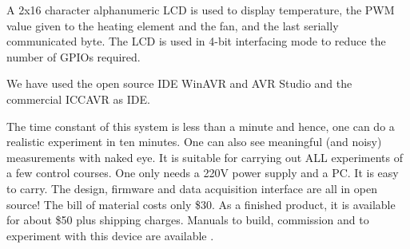 A 2x16 character alphanumeric LCD is used to display temperature, the
PWM value given to the heating element and the fan, and the last
serially communicated byte.  The LCD is used in 4-bit interfacing mode
to reduce the number of GPIOs required.

We have used the open source IDE WinAVR and AVR Studio and the
commercial ICCAVR as IDE.

The time constant of this system is less than a minute and hence, one
can do a realistic experiment in ten minutes.  One can also see
meaningful (and noisy) measurements with naked eye.  It is suitable
for carrying out ALL experiments of a few control courses.  One only
needs a 220V power supply and a PC.  It is easy to carry.  The design,
firmware and data acquisition interface are all in open source!  The
bill of material costs only \$30.  As a finished product, it is
available for about \$50 plus shipping charges.  Manuals to build,
commission and to experiment with this device are available
\cite{VL010}.
